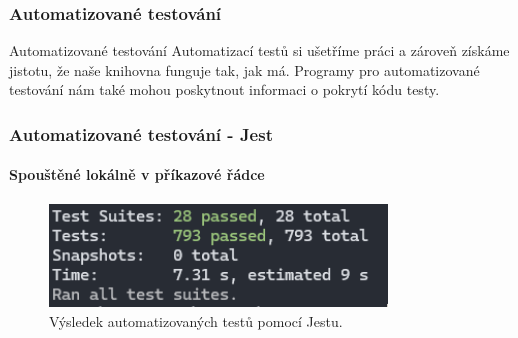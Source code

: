 \begin{frame}
    \frametitle{Automatizované testování}

    \begin{block}{Automatizované testování}
        Automatizací testů si ušetříme práci a zároveň získáme jistotu, že naše knihovna funguje tak, jak má.
        Programy pro automatizované testování nám také mohou poskytnout informaci o pokrytí kódu testy.
    \end{block}

\end{frame}

\begin{frame}
    \frametitle{Automatizované testování - Jest}
    \framesubtitle{Spouštěné lokálně v příkazové řádce}
    \begin{figure}
        \centering
        \includegraphics[width=0.8\textwidth]{../resources/tests.png}
        \caption{Výsledek automatizovaných testů pomocí Jestu.}
    \end{figure}
\end{frame}

